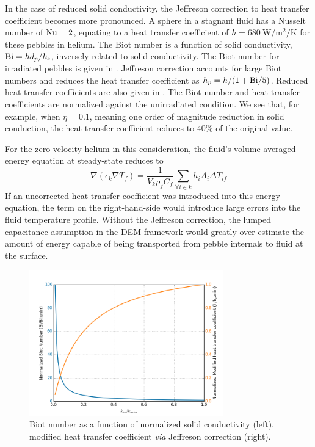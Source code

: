 In the case of reduced solid conductivity, the Jeffreson correction to heat transfer coefficient becomes more pronounced. A sphere in a stagnant fluid has a Nusselt number of $\mathrm{Nu} = 2$, equating to a heat transfer coefficient of $h =\SI{680}{\watt\per\meter\squared\per\kelvin}$ for these pebbles in helium. The Biot number is a function of solid conductivity, $\mathrm{Bi} = hd_p/k_s$, inversely related to solid conductivity. The Biot number for irradiated pebbles is given in . Jeffreson correction accounts for large Biot numbers and reduces the heat transfer coefficient as $h_p = h/(1 + \mathrm{Bi}/5)$. Reduced heat transfer coefficients are also given in . The Biot number and heat transfer coefficients are normalized against the unirradiated condition. We see that, for example, when $\eta = 0.1$, meaning one order of magnitude reduction in solid conduction, the heat transfer coefficient reduces to 40\% of the original value. 

For the zero-velocity helium in this consideration, the fluid's volume-averaged energy equation at steady-state reduces to 
\begin{equation}
\nabla\left(\epsilon_k\nabla T_f\right) = \frac{1}{V_k\rho_fC_f}\sum_{\forall i \in k} h_i A_i \Delta T_{if}
\end{equation}
If an uncorrected heat transfer coefficient was introduced into this energy equation, the term on the right-hand-side would introduce large errors into the fluid temperature profile. Without the Jeffreson correction, the lumped capacitance assumption in the DEM framework would greatly over-estimate the amount of energy capable of being transported from pebble internals to fluid at the surface.

\begin{figure}[ht]
    \centering
    \includegraphics[width = 0.75\textwidth]{figures/irradiated/biot-changes.png}
    \caption{Biot number as a function of normalized solid conductivity (left), modified heat transfer coefficient \textit{via} Jeffreson correction (right).}\label{fig:biot-changes}
\end{figure}

